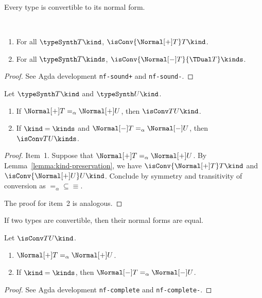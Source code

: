 Every type is convertible to its normal form.
\begin{proposition}~\label{lemma:kind-preservation}
  \begin{enumerate}
  \item For all $\typeSynth T\kind$,  $\isConv{\Normal[+] T}T\kind$.
  \item For all $\typeSynth T\kinds$,  $\isConv{\Normal[-] T}{\TDual T}\kinds$.
  \end{enumerate}
\end{proposition}
\begin{proof}
  See Agda development \texttt{nf-sound+} and \texttt{nf-sound-}.
\end{proof}

\begin{corollary}[Soundness] Let $\typeSynth T\kind$ and $\typeSynth U\kind$.
  \begin{enumerate}
  \item If $\Normal[+] T =_\alpha \Normal[+] U$, 
    then $\isConv TU\kind$.
  \item If $\kind = \kinds$ and  $\Normal[-] T =_\alpha \Normal[-]
    U$, then $\isConv TU\kinds$.
  \end{enumerate}
\end{corollary}
\begin{proof}
  Item~1. Suppose that $\Normal[+] T =_\alpha \Normal[+] U$. By
  Lemma~\ref{lemma:kind-preservation}, we have  $\isConv{\Normal[+]
    T}T\kind$ and  $\isConv{\Normal[+] U}U\kind$. Conclude by symmetry
  and transitivity of conversion as ${=_\alpha} \subseteq {\equiv}$.

  The proof for item~2 is analogous.
\end{proof}

If two types are convertible, then their normal forms are equal.
\begin{proposition}[Completeness]   Let $\isConv TU\kind$. 
  \begin{enumerate}
  \item  $\Normal[+]T =_\alpha \Normal[+]U$.
  \item    If $\kind=\kinds$, then $\Normal[-]T =_\alpha \Normal[-]U$. 
  \end{enumerate}
\end{proposition}
\begin{proof}
  See Agda development \texttt{nf-complete} and \texttt{nf-complete-}.
\end{proof}


